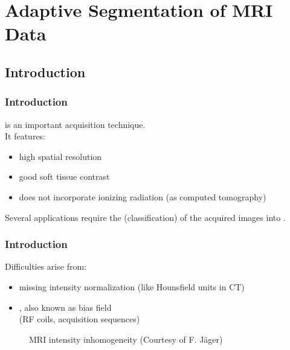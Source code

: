 \section{Adaptive Segmentation of MRI Data}

\subsection{Introduction}

\begin{frame}
  \frametitle{Introduction}

   is an important acquisition technique. \\[.5cm]

  It features:

  \begin{itemize}
    \item high spatial resolution
    \item good soft tissue contrast
    \item does not incorporate ionizing radiation (as computed tomography) \\[.75cm]
  \end{itemize}
  \pause

  Several applications require the  (classification) of the acquired images into .
\end{frame}


\begin{frame}
  \frametitle{Introduction \cont}

  Difficulties arise from:

  \begin{itemize}
    \item missing intensity normalization (like Hounsfield units in CT) \pause 
    \item {}, also known as bias field \\
      (RF coils, acquisition sequences)
  \end{itemize}
  \pspread
  
  \begin{figure}
    \centering
    \qquad
    \caption{MRI intensity inhomogeneity (Courtesy of F. J{\"a}ger)}
  \end{figure}
\end{frame}


